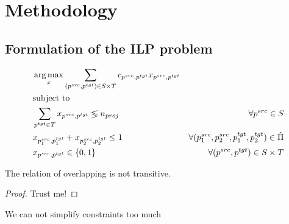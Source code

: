 \chapter{Methodology}
\label{sec:methodology}

\section{Formulation of the ILP problem}

\begin{definition}

\end{definition}
\begin{definition}

\end{definition}

\begin{align}
     & \operatorname*{arg\,max}\limits_x \sum\limits_{(p^{src}, p^{tgt}) \in S \times T} c_{p^{src}, p^{tgt}} x_{p^{src}, p^{tgt}}                                                                      \\
     & \text{subject to} \notag                                                                                                                                                        \\
     & \sum\limits_{p^{tgt} \in T} x_{p^{src}, p^{tgt}} \lessgtr n_{proj}                                         & \forall p^{src} \in S                                              \\
     & x_{p_1^{src}, p_1^{tgt}} + x_{p_2^{src}, p_2^{tgt}} \leq 1                                                 & \forall (p_1^{src}, p_2^{src}, p_1^{tgt}, p_2^{tgt}) \in \hat{\Pi} \\
     & x_{p^{src}, p^{tgt}} \in \{ 0, 1 \}                                                                        & \forall (p^{src}, p^{tgt}) \in S \times T
\end{align}

\begin{theorem}
    The relation of overlapping is not transitive.
\end{theorem}
\begin{proof}
    Trust me!
\end{proof}

\begin{corollary}
    We can not simplify constraints too much
\end{corollary}

